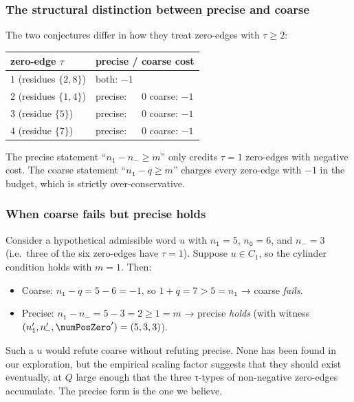 \documentclass[11pt,a4paper]{article}
\theoremstyle{plain}
\theoremstyle{definition}
\newcommand{\numOnes}{n_{\mathtt{1}}}
\newcommand{\numNeg}{n_{\!-}}
\newcommand{\numZeros}{n_{\mathtt{0}}}
\begin{document}
\subsubsection*{The structural distinction between precise and coarse}

The two conjectures differ in how they treat zero-edges with
$\tau \ge 2$:
\begin{center}\small
\begin{tabular}{ll}
\toprule
zero-edge $\tau$ & precise / coarse cost \\
\midrule
$1$ (residues $\{2, 8\}$) & both: $-1$ \\
$2$ (residues $\{1, 4\}$) & precise: $\phantom{+}0$ \quad coarse: $-1$ \\
$3$ (residue $\{5\}$)     & precise: $\phantom{+}0$ \quad coarse: $-1$ \\
$4$ (residue $\{7\}$)     & precise: $\phantom{+}0$ \quad coarse: $-1$ \\
\bottomrule
\end{tabular}
\end{center}
The precise statement ``$\numOnes - \numNeg \ge m$'' only credits
$\tau = 1$ zero-edges with negative cost. The coarse statement
``$\numOnes - q \ge m$'' charges every zero-edge with $-1$ in the
budget, which is strictly over-conservative.

\subsubsection*{When coarse fails but precise holds}

Consider a hypothetical admissible word $u$ with $\numOnes = 5$,
$\numZeros = 6$, and $\numNeg = 3$ (i.e.\ three of the six zero-edges
have $\tau = 1$). Suppose $u \in C_1$, so the cylinder condition
holds with $m = 1$. Then:
\begin{itemize}
  \item Coarse: $\numOnes - q = 5 - 6 = -1$, so
        $1 + q = 7 > 5 = \numOnes$ → coarse \emph{fails}.
  \item Precise: $\numOnes - \numNeg = 5 - 3 = 2 \ge 1 = m$ → precise
        \emph{holds} (with witness
        $(\numOnes', \numNeg', \numPosZero') = (5, 3, 3)$).
\end{itemize}
Such a $u$ would refute coarse without refuting precise. None has
been found in our exploration, but the empirical scaling factor
suggests that they should exist eventually, at $Q$ large enough that
the three τ-types of non-negative zero-edges accumulate. The precise
form is the one we believe.
\end{document}
